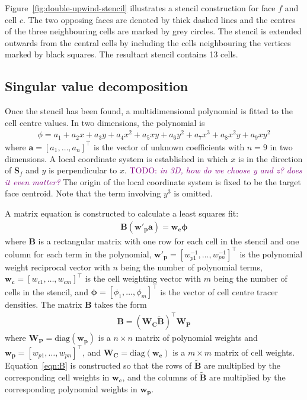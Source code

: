 \documentclass{article}
\newcommand{\TODO}[1]{\textcolor{purple}{TODO: \emph{#1}}}
\begin{document}
Figure~\ref{fig:double-upwind-stencil} illustrates a stencil construction for face $f$ and cell $c$.  The two opposing faces are denoted by thick dashed lines and the centres of the three neighbouring cells are marked by grey circles.  The stencil is extended outwards from the central cells by including the cells neighbouring the vertices marked by black squares.  The resultant stencil contains 13 cells.

\subsection{Singular value decomposition}
Once the stencil has been found, a multidimensional polynomial is fitted to the cell centre values.
In two dimensions, the polynomial is
\begin{align}
	\phi = a_1 + a_2 x + a_3 y + a_4 x^2 + a_5 xy + a_6 y^2 + a_7 x^3 + a_8 x^2 y + a_9 x y^2
\end{align}
where $\mathbf{a} = [a_1, \ldots, a_n]^\intercal$ is the vector of unknown coefficients with $n=9$ in two dimensions.  A local coordinate system is established in which $x$ is in the direction of $\mathbf{S}_f$ and $y$ is perpendicular to $x$.
\TODO{in 3D, how do we choose y and z? does it even matter?}
The origin of the local coordinate system is fixed to be the target face centroid.
Note that the term involving $y^3$ is omitted.

A matrix equation is constructed to calculate a least squares fit:
\begin{align}
	\mathbf{B} \left(\mathbf{w'_p} \mathbf{a}\right) = \mathbf{w_c} \bm{\phi}
\end{align}
where $\mathbf{B}$ is a rectangular matrix with one row for each cell in the stencil and one column for each term in the polynomial, $\mathbf{w'_p} = [w_{p1}^{-1}, \ldots, w_{pn}^{-1}]^\intercal$ is the polynomial weight reciprocal vector with $n$ being the number of polynomial terms,  $\mathbf{w_c} = [w_{c1}, \ldots, w_{cm}]^\intercal$ is the cell weighting vector with $m$ being the number of cells in the stencil, and $\bm{\phi} = [\phi_1, \ldots, \phi_m]^\intercal$ is the vector of cell centre tracer densities.
The matrix $\mathbf{B}$ takes the form
\begin{align}
	\mathbf{B} = \left( \mathbf{W_C} \mathbf{\tilde{B}} \right)^\intercal \mathbf{W_P} \label{eqn:B}
\end{align}
where $\mathbf{W_P} = \mathrm{diag}(\mathbf{w_p})$ is a $n \times n$ matrix of polynomial weights and $\mathbf{w_p} = [w_{p1}, \ldots, w_{pn}]^\intercal$, and $\mathbf{W_C} = \mathrm{diag}(\mathbf{w_c})$ is a $m \times m$ matrix of cell weights.  Equation~\ref{eqn:B} is constructed so that the rows of $\mathbf{\tilde{B}}$ are multiplied by the corresponding cell weights in $\mathbf{w_c}$, and the columns of $\mathbf{\tilde{B}}$ are multiplied by the corresponding polynomial weights in $\mathbf{w_p}$.
\end{document}
